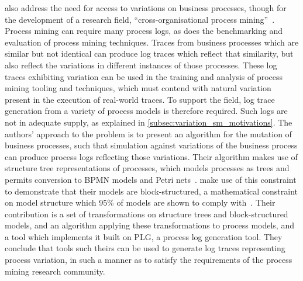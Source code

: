 \citeauthor{pourmasoumi2015business} also address the need for access to
variations on business processes, though for the development of a research
field, ``cross-organisational process mining''~\cite{pourmasoumi2015business}.
Process mining can require many process logs, as does the benchmarking and
evaluation of process mining techniques. Traces from business processes which
are similar but not identical can produce log traces which reflect that
similarity, but also reflect the variations in different instances of those
processes. These log traces exhibiting variation can be used in the training and
analysis of process mining tooling and techniques, which must contend with
natural variation present in the execution of real-world traces. To support the
field, log trace generation from a variety of process models is therefore
required. Such logs are not in adequate supply, as explained in
\cref{subsec:variation_sm_motivations}. The authors' approach to the problem is
to present an algorithm for the mutation of business processes, such that
simulation against variations of the business process can produce process logs
reflecting those variations. Their algorithm makes use of structure tree
representations of processes, which models processes as trees and permits
conversion to BPMN models and Petri nets~\cite{buijs2014flexible}.
\citeauthor{pourmasoumi2015business} make use of this constraint to demonstrate
that their models are block-structured, a mathematical constraint on model
structure which 95\% of models are shown to comply with~\cite{chenthesis}. Their
contribution is a set of transformations on structure trees and block-structured
models, and an algorithm applying these transformations to process models, and a
tool which implements it built on PLG, a process log generation tool. They
conclude that tools such theirs can be used to generate log traces representing
process variation, in such a manner as to satisfy the requirements of the
process mining research community.

